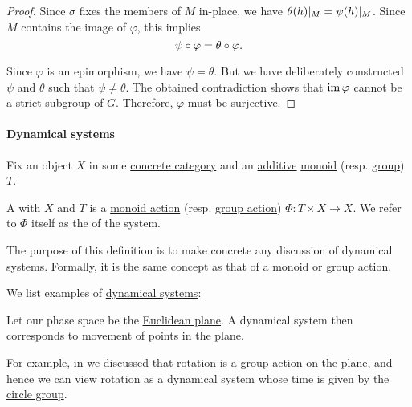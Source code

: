 \begin{proof}
  Since \( \sigma \) fixes the members of \( M \) in-place, we have \( \theta(h)\vert_M = \psi(h)\vert_M \). Since \( M \) contains the image of \( \varphi \), this implies
  \begin{equation*}
    \psi \bincirc \varphi = \theta \bincirc \varphi.
  \end{equation*}

  Since \( \varphi \) is an epimorphism, we have \( \psi = \theta \). But we have deliberately constructed \( \psi \) and \( \theta \) such that \( \psi \neq \theta \). The obtained contradiction shows that \( \operatorname{im} \varphi \) cannot be a strict subgroup of \( G \). Therefore, \( \varphi \) must be surjective.
\end{proof}

\paragraph{Dynamical systems}

\begin{definition}\label{def:dynamical_system}\mimprovised
  Fix an object \( X \) in some \hyperref[def:concrete_category]{concrete category} and an \hyperref[con:additive_semigroup]{additive} \hyperref[def:monoid]{monoid} (resp. \hyperref[def:group]{group}) \( T \).

  A  with  \( X \) and  \( T \) is a \hyperref[def:monoid_action]{monoid action} (resp. \hyperref[def:group_action]{group action}) \( \Phi: T \times X \to X \). We refer to \( \Phi \) itself as the  of the system.
\end{definition}
\begin{comments}
  \item The purpose of this definition is to make concrete any discussion of dynamical systems. Formally, it is the same concept as that of a monoid or group action.
\end{comments}

\begin{example}\label{ex:def:dynamical_system}
  We list examples of \hyperref[def:dynamical_system]{dynamical systems}:
  \begin{thmenum}
     Let our phase space be the \hyperref[def:euclidean_plane]{Euclidean plane}. A dynamical system then corresponds to movement of points in the plane.

    For example, in  we discussed that rotation is a group action on the plane, and hence we can view rotation as a dynamical system whose time is given by the \hyperref[def:circle_group]{circle group}.
  \end{thmenum}
\end{example}

